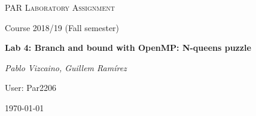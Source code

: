 \makeatletter
\begin{titlepage}
\thispagestyle{empty}
\begin{center}
	\centering
	\vspace{1cm}
	{\scshape\Large PAR Laboratory Assignment\par}
	\vspace{0.75cm}
	{\Large Course 2018/19 (Fall semester)\par}
	\vspace{0.75cm}
	{\huge\bfseries Lab 4: Branch and bound with OpenMP: N-queens puzzle\par}
	\vspace{1cm}
	{\Large\itshape Pablo Vizcaino, Guillem Ramírez\par}
    \vspace{0.5cm}
    {\Large User: Par2206\par}
    \vfill
	{\large \today\par}
\end{center}
\clearpage
\end{titlepage}
